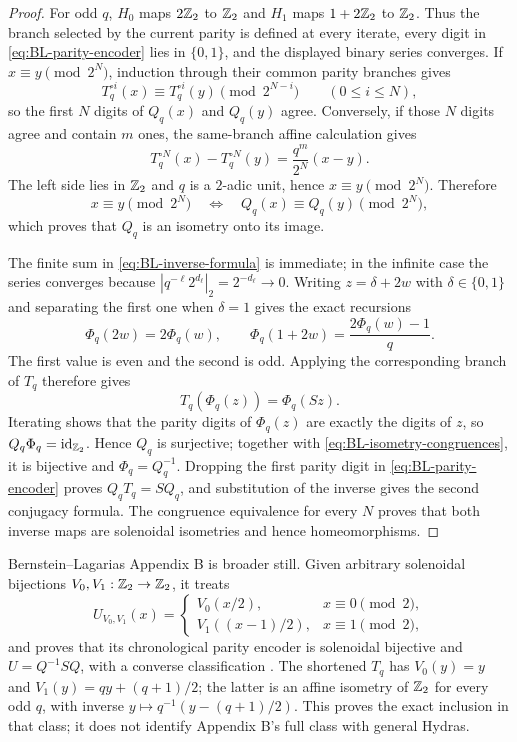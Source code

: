 \begin{proof}
For odd $q$, $H_0$ maps $2\mathbb Z_2$ to $\mathbb Z_2$ and $H_1$ maps
$1+2\mathbb Z_2$ to $\mathbb Z_2$.  Thus the branch selected by the current parity is
defined at every iterate, every digit in \cref{eq:BL-parity-encoder} lies in
$\{0,1\}$, and the displayed binary series converges.  If
$x\equiv y\pmod{2^N}$, induction through their common parity
branches gives
\[
 T_q^{\circ i}(x)\equiv T_q^{\circ i}(y)
 \pmod{2^{N-i}}
 \qquad(0\leq i\leq N),
\]
so the first $N$ digits of $Q_q(x)$ and $Q_q(y)$ agree.  Conversely, if
those $N$ digits agree and contain $m$ ones, the same-branch affine
calculation gives
\[
 T_q^{\circ N}(x)-T_q^{\circ N}(y)
 =\frac{q^m}{2^N}(x-y).
\]
The left side lies in $\mathbb Z_2$ and $q$ is a $2$-adic unit, hence
$x\equiv y\pmod{2^N}$.  Therefore
\begin{equation}
\label{eq:BL-isometry-congruences}
 x\equiv y\pmod{2^N}
 \quad\Longleftrightarrow\quad
 Q_q(x)\equiv Q_q(y)\pmod{2^N},
\end{equation}
which proves that $Q_q$ is an isometry onto its image.

The finite sum in \cref{eq:BL-inverse-formula} is immediate; in the infinite
case the series converges because
$|q^{-\ell}2^{d_\ell}|_2=2^{-d_\ell}\to0$.  Writing
$z=\delta+2w$ with $\delta\in\{0,1\}$ and separating the first one when
$\delta=1$ gives the exact recursions
\begin{equation}
\label{eq:BL-Phi-recursion}
 \Phi_q(2w)=2\Phi_q(w),
 \qquad
 \Phi_q(1+2w)=\frac{2\Phi_q(w)-1}{q}.
\end{equation}
The first value is even and the second is odd.  Applying the corresponding
branch of $T_q$ therefore gives
\[
 T_q(\Phi_q(z))=\Phi_q(Sz).
\]
Iterating shows that the parity digits of $\Phi_q(z)$ are exactly the digits
of $z$, so $Q_q\Phi_q=\operatorname{id}_{\mathbb Z_2}$.  Hence $Q_q$ is
surjective; together with \cref{eq:BL-isometry-congruences}, it is bijective
and $\Phi_q=Q_q^{-1}$.  Dropping the first parity digit in
\cref{eq:BL-parity-encoder} proves $Q_qT_q=SQ_q$, and substitution of the
inverse gives the second conjugacy formula.  The congruence equivalence for
every $N$ proves that both inverse maps are solenoidal isometries and hence
homeomorphisms.
\end{proof}

Bernstein--Lagarias Appendix B is broader still.  Given arbitrary solenoidal
bijections $V_0,V_1:\mathbb Z_2\to\mathbb Z_2$, it treats
\[
 U_{V_0,V_1}(x)=
 \begin{cases}
 V_0(x/2),&x\equiv0\pmod2,\\
 V_1((x-1)/2),&x\equiv1\pmod2,
 \end{cases}
\]
and proves that its chronological parity encoder is solenoidal bijective and
$U=Q^{-1}SQ$, with a converse classification
\cite[App.~B, Thms.~B.1--B.2]{BernsteinLagarias}.  The shortened $T_q$
has $V_0(y)=y$ and $V_1(y)=qy+(q+1)/2$; the latter is an affine isometry of
$\mathbb Z_2$ for every odd $q$, with inverse
$y\mapsto q^{-1}(y-(q+1)/2)$.  This proves the exact inclusion in that
class; it does not identify Appendix B's full class with general Hydras.


